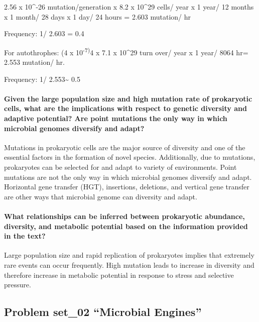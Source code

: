 \documentclass[]{article}
\let\oldparagraph\paragraph
\renewcommand{\paragraph}[1]{\oldparagraph{#1}\mbox{}}
\begin{document}
2.56 x 10\^{}-26 mutation/generation x 8.2 x 10\^{}29 cells/ year x 1
year/ 12 months x 1 month/ 28 days x 1 day/ 24 hours = 2.603 mutation/
hr

Frequency: 1/ 2.603 = 0.4

For autothrophes: (4 x 10\textsuperscript{-7)}4 x 7.1 x 10\^{}29 turn
over/ year x 1 year/ 8064 hr= 2.553 mutation/ hr.

Frequency: 1/ 2.553\textasciitilde{} 0.5

\paragraph{Given the large population size and high mutation rate of
prokaryotic cells, what are the implications with respect to genetic
diversity and adaptive potential? Are point mutations the only way in
which microbial genomes diversify and
adapt?}\label{given-the-large-population-size-and-high-mutation-rate-of-prokaryotic-cells-what-are-the-implications-with-respect-to-genetic-diversity-and-adaptive-potential-are-point-mutations-the-only-way-in-which-microbial-genomes-diversify-and-adapt}

Mutations in prokaryotic cells are the major source of diversity and one
of the essential factors in the formation of novel species.
Additionally, due to mutations, prokaryotes can be selected for and
adapt to variety of environments. Point mutations are not the only way
in which microbial genomes diversify and adapt. Horizontal gene transfer
(HGT), insertions, deletions, and vertical gene transfer are other ways
that microbial genome can diversity and adapt.

\paragraph{What relationships can be inferred between prokaryotic
abundance, diversity, and metabolic potential based on the information
provided in the
text?}\label{what-relationships-can-be-inferred-between-prokaryotic-abundance-diversity-and-metabolic-potential-based-on-the-information-provided-in-the-text}

Large population size and rapid replication of prokaryotes implies that
extremely rare events can occur frequently. High mutation leads to
increase in diversity and therefore increase in metabolic potential in
response to stress and selective pressure.

\subsection{\texorpdfstring{Problem set\_02 ``Microbial
Engines''}{Problem set\_02 Microbial Engines}}\label{problem-set_02-microbial-engines}
\end{document}
